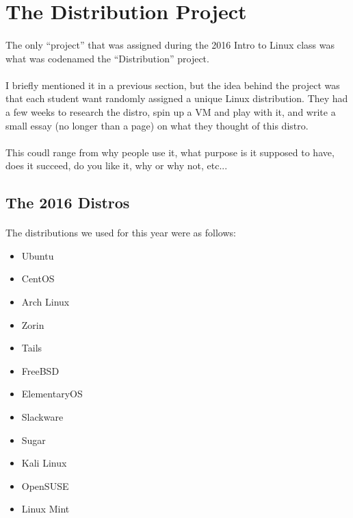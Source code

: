 \documentclass[11pt]{article}
\begin{document}
\newpage

\section{The Distribution Project}

\paragraph{} The only ``project'' that was assigned during the 2016 Intro to Linux class was what was codenamed the ``Distribution'' project.

\paragraph{} I briefly mentioned it in a previous section, but the idea behind the project was that each student want randomly assigned a unique Linux distribution. They had a few weeks to research the distro, spin up a VM and play with it, and write a small essay (no longer than a page) on what they thought of this distro.

\paragraph{} This coudl range from why people use it, what purpose is it supposed to have, does it succeed, do you like it, why or why not, etc...

\subsection{The 2016 Distros}

\paragraph{} The distributions we used for this year were as follows:

\begin{itemize}
	\item Ubuntu
	\item CentOS
	\item Arch Linux
	\item Zorin
	\item Tails
	\item FreeBSD
	\item ElementaryOS
	\item Slackware
	\item Sugar
	\item Kali Linux
	\item OpenSUSE
	\item Linux Mint
\end{itemize}
\end{document}
